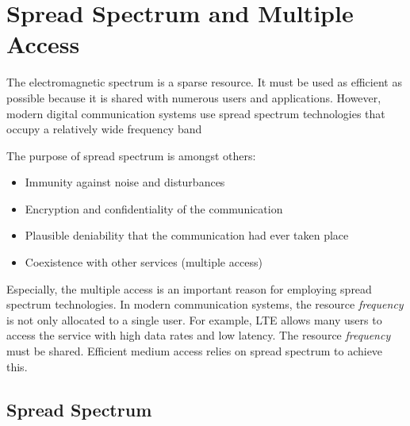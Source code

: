 %
%
%

\chapter{Spread Spectrum and Multiple Access}

\begin{refsection}
	
The electromagnetic spectrum is a sparse resource. It must be used as efficient as possible because it is shared with numerous users and applications. However, modern digital communication systems use spread spectrum technologies that occupy a relatively wide frequency band

The purpose of spread spectrum is amongst others:
\begin{itemize}
	\item Immunity against noise and disturbances
	\item Encryption and confidentiality of the communication
	\item Plausible deniability that the communication had ever taken place
	\item Coexistence with other services (multiple access)
\end{itemize}

Especially, the multiple access is an important reason for employing spread spectrum technologies. In modern communication systems, the resource \emph{frequency} is not only allocated to a single user. For example, \ac{LTE} allows many users to access the service with high data rates and low latency. The resource \emph{frequency} must be shared. Efficient medium access relies on spread spectrum to achieve this.

\section{Spread Spectrum}


\end{refsection}
